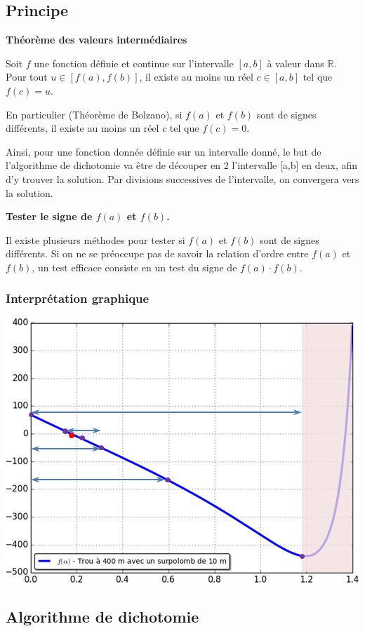 \documentclass[10pt]{article}
\begin{document}
\subsection{Principe}
\begin{theo}
\textbf{Théorème des valeurs intermédiaires}

Soit $f$ une fonction définie et continue sur l'intervalle $[a,b]$ à valeur dans $\mathbb{R}$. Pour tout $u\in[f(a),f(b)]$, il existe au moins un réel $c\in [a,b]$  tel que $f(c)=u$.

 En particulier (Théorème de Bolzano), si $f(a)$ et $f(b)$ sont de signes différents, il existe au moins un réel $c$ tel que $f(c)=0$. 
\end{theo}

Ainsi, pour une fonction donnée définie sur un intervalle donné, le but de l'algorithme de dichotomie va être de découper en 2 l'intervalle [a,b] en deux, afin d'y trouver la solution. Par divisions successives de l'intervalle, on convergera vers la solution.

\begin{rem}
\textbf{Tester le signe de $f(a)$ et $f(b)$.}

Il existe plusieurs méthodes pour tester si $f(a)$ et $f(b)$ sont de signes différents. Si on ne se préoccupe pas de savoir la relation d'ordre entre $f(a)$ et $f(b)$, un test efficace consiste en un test du signe de $f(a)\cdot f(b)$. 
\end{rem}

\subsubsection*{Interprétation graphique}

\begin{center}
\includegraphics[width=.6\textwidth]{images/InterpretationG}
\end{center}


\subsection{Algorithme de dichotomie}
\end{document}
